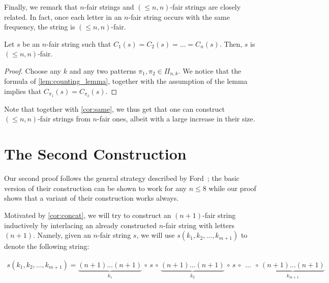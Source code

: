 \documentclass{article}
\begin{document}
Finally, we remark that $n$-fair strings and $(\le n, n)$-fair strings are closely related. In fact, once each letter in an $n$-fair string occurs with the same frequency, the string is $(\le n, n)$-fair. 

\begin{lemma}
\label{lem:fair_implies_fairer}
    Let $s$ be an $n$-fair string such that $C_1(s) = C_2(s) = \dots = C_n(s)$. Then, $s$ is $(\le n, n)$-fair. 
\end{lemma}
\begin{proof}
    Choose any $k$ and any two patterns $\pi_1, \pi_2 \in \Pi_{n,k}$. We notice that the formula of  \cref{lem:counting_lemma}, together with the assumption of the lemma implies that $C_{\pi_1}(s) = C_{\pi_2}(s)$. 
\end{proof}
Note that together with \cref{cor:same}, we thus get that one can construct $(\le n, n)$-fair strings from $n$-fair ones, albeit with a large increase in their size. 


\section{The Second Construction}
\label{sec:algebraic_proof}

Our second proof follows the general strategy described by Ford~\cite{ford2023go}; the basic version of their construction can be shown to work for any $n \le 8$ while our proof shows that a variant of their construction works always. 

Motivated by \cref{cor:concat}, we will try to construct an $(n+1)$-fair string inductively by interlacing an already constructed $n$-fair string with letters $(n+1)$. Namely, given an $n$-fair string $s$, we will use $s(k_1, k_2, \dots, k_{m+1})$ to denote the following string: 

\begin{align}
\label{eq:construction}
s(k_1, k_2, \dots, k_{m+1}) = \underbrace{(n+1) \dots (n+1)}_{k_1} \,\circ\, s \,\circ\, \underbrace{(n+1) \dots (n+1)}_{k_2} \,\circ\,  s \,\circ\, \;\dots\;  \,\circ\, \underbrace{(n+1) \dots (n+1)}_{k_{m+1}} 
\end{align}
\end{document}
